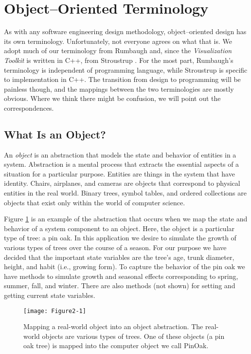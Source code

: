 \section{Object--Oriented Terminology}

As with any software engineering design methodology, object--oriented design has its own terminology. Unfortunately, not everyone agrees on what that is. We adopt much of our terminology from Rumbaugh \cite{Rumbaugh91} and, since the \emph{Visualization Toolkit} is written in C++, from Stroustrup \cite{Stroustrup84}. For the most part, Rumbaugh's terminology is independent of programming language, while Stroustrup is specific to implementation in C++. The transition from design to programming will be painless though, and the mappings between the two terminologies are mostly obvious. Where we think there might be confusion, we will point out the correspondences.

\subsection{What Is an Object?}

An \emph{object} is an abstraction that models the state and behavior of entities in a system. Abstraction is a mental process that extracts the essential aspects of a situation for a particular purpose. Entities are things in the system that have identity. Chairs, airplanes, and cameras are objects that correspond to physical entities in the real world. Binary trees, symbol tables, and ordered collections are objects that exist only within the world of computer science.

Figure \ref{fig:Figure2-1} is an example of the abstraction that occurs when we map the state and behavior of a system component to an object. Here, the object is a particular type of tree: a pin oak. In this application we desire to simulate the growth of various types of trees over the course of a season. For our purpose we have decided that the important state variables are the tree's age, trunk diameter, height, and habit (i.e., growing form). To capture the behavior of the pin oak we have methods to simulate growth and seasonal effects corresponding to spring, summer, fall, and winter. There are also methods (not shown) for setting and getting current state variables.

\begin{figure}[!htb]
	\centering
	\texttt{[image: Figure2-1]}
	\caption{Mapping a real-world object into an object abstraction. The real-world objects are various types of trees. One of these objects (a pin oak tree) is mapped into the computer object we call PinOak.}
	\label{fig:Figure2-1}
\end{figure}

